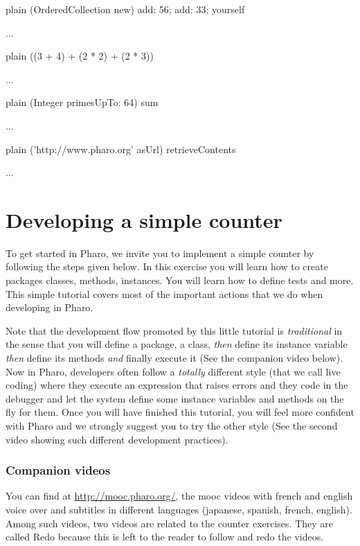 \documentclass[10pt,twoside,english]{_support/latex/sbabook/sbabook}
\begin{document}
\begin{displaycode}{plain}
(OrderedCollection new)
    add: 56; 
    add: 33; 
    yourself




 ...
\end{displaycode}

\begin{displaycode}{plain}
((3 + 4) + (2 * 2) + (2 * 3))


 ...
\end{displaycode}

\begin{displaycode}{plain}
(Integer primesUpTo: 64) sum


 ...
\end{displaycode}

\begin{displaycode}{plain}
('http://www.pharo.org' asUrl) retrieveContents


 ...
\end{displaycode}
\chapter{Developing a simple counter}
To get started in Pharo, we invite you to implement a simple counter by following the steps given below. In this exercise you will learn how to create packages classes, methods, instances. You will learn how to define tests and more. This simple tutorial covers most of the important actions that we do when developing in Pharo. 

Note that the development flow promoted by this little tutorial is \textit{traditional} in the sense that you will define a package, a class, \textit{then} define its instance variable \textit{then} define its methods \textit{and} finally execute it (See the companion video below). Now in Pharo, developers often follow a \textit{totally} different style (that we call live coding) where they execute an expression that raises errors and they code in the debugger and let the system define some instance variables and methods on the fly for them. Once you will have finished this tutorial, you will feel more confident with Pharo and we strongly suggest you to try the other style (See the second video showing such different development practices).
\subsection{Companion videos}
You can find at \url{http://mooc.pharo.org/}, the mooc videos with french and english voice over and subtitles in different languages (japanese, spanish, french, english).
Among such videos, two videos are related to the counter exercises. They are called Redo because this is left to the reader to follow and redo the 
videos. 
\end{document}
